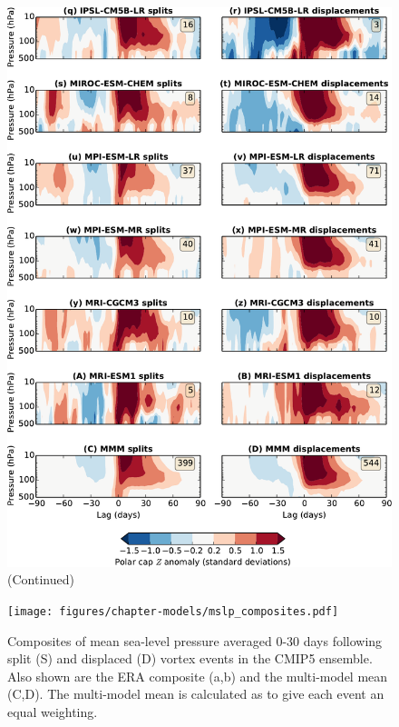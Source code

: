 \begin{figure}
 \ContinuedFloat
 \centering
 \noindent\includegraphics[width=\textwidth]{figures/chapter-models/dripping_paint2.pdf}
 \caption[]{(Continued)}
 \label{Fig2}
\end{figure}

\begin{figure}
 \centering
 \noindent\texttt{[image: figures/chapter-models/mslp\_composites.pdf]}
 \caption[MSLP composites following splits and displacements in the CMIP5
 models]{Composites of mean sea-level pressure averaged 0-30 days following
   split (S) and displaced (D) vortex events in the CMIP5 ensemble. Also shown
   are the ERA composite (a,b) and the multi-model mean (C,D). The multi-model
   mean is calculated as to give each event an equal weighting.}
 \label{Fig2}
\end{figure}

